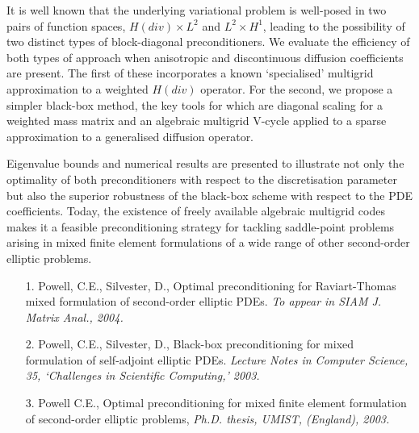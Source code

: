 \documentclass{report}
\begin{document}
It is well known that the underlying variational problem is well-posed in
two pairs of function spaces, $H(div)\times L^{2}$ and $L^{2} \times
H^{1}$, leading to the possibility of two distinct types of
block-diagonal preconditioners. We evaluate the efficiency of both types
of approach when anisotropic and discontinuous diffusion coefficients are
present. The
first of these incorporates a known `specialised' multigrid approximation
to a weighted $H(div)$ operator. For the second, we propose a simpler
black-box method, the key tools for which are diagonal scaling for a
weighted mass matrix and an algebraic multigrid V-cycle applied to a
sparse approximation to a generalised diffusion operator.

Eigenvalue bounds and numerical results are presented to illustrate not
only the optimality of both preconditioners with respect to the
discretisation parameter but also the superior robustness of the
black-box scheme with respect to the PDE coefficients. Today, the
existence of freely available algebraic multigrid codes makes it a
feasible preconditioning strategy for tackling saddle-point problems
arising in mixed finite element formulations of a wide range of other
second-order elliptic problems.

\begin{enumerate}
\item[1.] Powell, C.E., Silvester, D., Optimal preconditioning for
Raviart-Thomas mixed formulation of second-order elliptic PDEs.
\textit{To appear in SIAM J. Matrix Anal., 2004.}

\item[2.] Powell, C.E., Silvester, D., Black-box preconditioning for
mixed formulation of self-adjoint elliptic PDEs. \textit{Lecture Notes in
Computer Science, 35, `Challenges in Scientific Computing,' 2003.}

\item[3.] Powell C.E., Optimal preconditioning for mixed finite element
formulation of second-order elliptic problems, \textit{Ph.D. thesis,
UMIST, (England), 2003.}
\end{enumerate}
\end{document}
